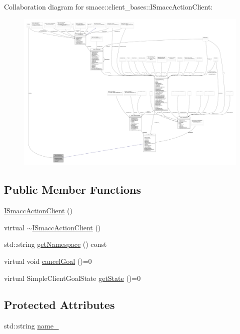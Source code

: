 Collaboration diagram for smacc\+:\+:client\+\_\+bases\+:\+:I\+Smacc\+Action\+Client\+:
\nopagebreak
\begin{figure}[H]
\begin{center}
\leavevmode
\includegraphics[width=350pt]{classsmacc_1_1client__bases_1_1ISmaccActionClient__coll__graph}
\end{center}
\end{figure}
\subsection*{Public Member Functions}
\begin{DoxyCompactItemize}
\item 
\hyperlink{classsmacc_1_1client__bases_1_1ISmaccActionClient_a379f2672d1b971422821026ca90eb96a}{I\+Smacc\+Action\+Client} ()
\item 
virtual \hyperlink{classsmacc_1_1client__bases_1_1ISmaccActionClient_a258324a60e2939b3fef3cb9b4b1730e5}{$\sim$\+I\+Smacc\+Action\+Client} ()
\item 
std\+::string \hyperlink{classsmacc_1_1client__bases_1_1ISmaccActionClient_af7e68149691fe6c9284f6f80c19932d8}{get\+Namespace} () const
\item 
virtual void \hyperlink{classsmacc_1_1client__bases_1_1ISmaccActionClient_ac4880d5bb0e8a343d323a6c46984476d}{cancel\+Goal} ()=0
\item 
virtual Simple\+Client\+Goal\+State \hyperlink{classsmacc_1_1client__bases_1_1ISmaccActionClient_a7380270966cec25f03ec288c747a2d7e}{get\+State} ()=0
\end{DoxyCompactItemize}
\subsection*{Protected Attributes}
\begin{DoxyCompactItemize}
\item 
std\+::string \hyperlink{classsmacc_1_1client__bases_1_1ISmaccActionClient_a74c660a4c111a3b8858b9b7b1cedc866}{name\+\_\+}
\end{DoxyCompactItemize}
